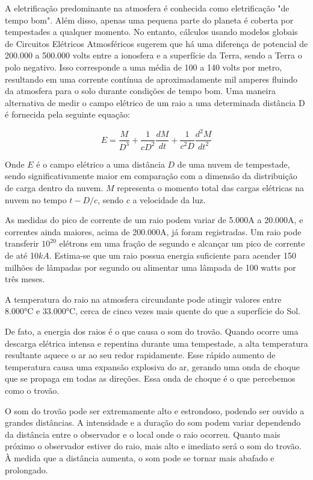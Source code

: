 \documentclass[a4paper, 12pt, onecolumn,singlespacing]{article}
\begin{document}
	A eletrificação predominante na atmosfera é conhecida como eletrificação "de tempo bom". Além disso, apenas uma pequena parte do planeta é coberta por tempestades a qualquer momento. No entanto, cálculos usando modelos globais de Circuitos Elétricos Atmosféricos sugerem que há uma diferença de potencial de 200.000 a 500.000 volts entre a ionosfera e a superfície da Terra, sendo a Terra o polo negativo. Isso corresponde a uma média de 100 a 140 volts por metro, resultando em uma corrente contínua de aproximadamente mil amperes fluindo da atmosfera para o solo durante condições de tempo bom. Uma maneira alternativa de medir o campo elétrico de um raio a uma determinada distância D é fornecida pela seguinte equação:
	
	\begin{equation}
		E = \frac{M}{D^3} + \frac{1}{cD^2}\frac{dM}{dt} + \frac{1}{c^2D}\frac{d^2M}{dt^2}
	\end{equation}
	
	Onde $E$ é o campo elétrico a uma distância $D$ de uma nuvem de tempestade, sendo significativamente maior em comparação com a dimensão da distribuição de carga dentro da nuvem. $M$ representa o momento total das cargas elétricas na nuvem no tempo $t - D/c$, sendo $c$ a velocidade da luz.
	
	As medidas do pico de corrente de um raio podem variar de 5.000A a 20.000A, e correntes ainda maiores, acima de 200.000A, já foram registradas. Um raio pode transferir $10^20$ elétrons em uma fração de segundo e alcançar um pico de corrente de até 10$kA$. Estima-se que um raio possua energia suficiente para acender 150 milhões de lâmpadas por segundo ou alimentar uma lâmpada de 100 watts por três meses.
	
	A temperatura do raio na atmosfera circundante pode atingir valores entre 8.000°C e 33.000°C, cerca de cinco vezes mais quente do que a superfície do Sol.
	
	De fato, a energia dos raios é o que causa o som do trovão. Quando ocorre uma descarga elétrica intensa e repentina durante uma tempestade, a alta temperatura resultante aquece o ar ao seu redor rapidamente. Esse rápido aumento de temperatura causa uma expansão explosiva do ar, gerando uma onda de choque que se propaga em todas as direções. Essa onda de choque é o que percebemos como o trovão.
	
	O som do trovão pode ser extremamente alto e estrondoso, podendo ser ouvido a grandes distâncias. A intensidade e a duração do som podem variar dependendo da distância entre o observador e o local onde o raio ocorreu. Quanto mais próximo o observador estiver do raio, mais alto e imediato será o som do trovão. À medida que a distância aumenta, o som pode se tornar mais abafado e prolongado.
	
\end{document}
